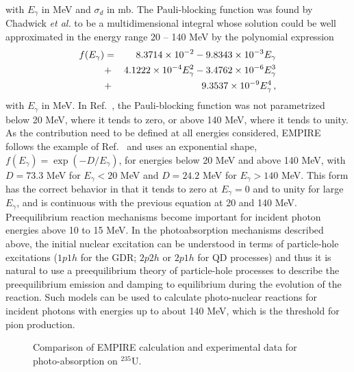 with $E_{\gamma}$ in MeV and $\sigma_{d}$ in mb. The Pauli-blocking function
was found by Chadwick \emph{et al.} to be a multidimensional integral whose
solution could be well approximated in the energy range 20 -- 140 MeV by the
polynomial expression
\begin{eqnarray}
f(E_{\gamma}) & = & \;8.3714\times10^{-2}-9.8343\times10^{-3}E_{\gamma}
\notag \\
&+&4.1222\times10^{-4}E_{\gamma}^{2} -3.4762\times10^{-6}E_{\gamma}^{3}
\notag \\
&+&9.3537\times10^{-9}E_{\gamma}^{4}\,,
\end{eqnarray}
with $E_{\gamma}$ in MeV. In Ref.~\cite{chadQD}, the Pauli-blocking function
was not parametrized below 20 MeV, where it tends to zero, or above 140 MeV,
where it tends to unity. As the contribution need to be defined at all
energies considered, EMPIRE follows the example of Ref.~\cite{PHNuc} and
uses an exponential shape, $f(E_{\gamma})=\exp(-D/E_{\gamma})$, for energies
below 20 MeV and above 140 MeV, with $D=73.3$ MeV for $E_{\gamma}<20$ MeV
and $D=24.2$ MeV for $E_{\gamma}>140$ MeV. This form has the correct
behavior in that it tends to zero at $E_{\gamma}=0$ and to unity for large $%
E_{\gamma}$, and is continuous with the previous equation at 20 and 140 MeV.
Preequilibrium reaction mechanisms become important for incident photon
energies above 10 to 15 MeV. In the photoabsorption mechanisms described
above, the initial nuclear excitation can be understood in terms of
particle-hole excitations ($1p1h$ for the GDR; $2p2h$ or $2p1h$ for QD
processes) and thus it is natural to use a preequilibrium theory of
particle-hole processes to describe the preequilibrium emission and damping
to equilibrium during the evolution of the reaction. Such models can be used
to calculate photo-nuclear reactions for incident photons with energies up
to about 140 MeV, which is the threshold for pion production.
\begin{figure}[htbp]
\caption{Comparison of EMPIRE calculation and experimental data for
photo-absorption on $^{235}$U.}
\label{u235abs}
\end{figure}

